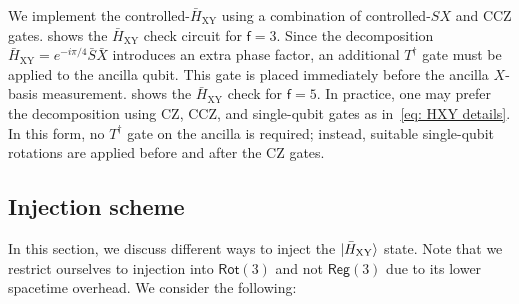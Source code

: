 \documentclass[%
    aps, 
    physrev,
    reprint,
]{revtex4-2}
\newcommand{\fd}[1]{\mathsf{f}=#1}
\newcommand{\rot}[1]{\mathsf{Rot}(#1)}
\newcommand{\reg}[1]{\mathsf{Reg}(#1)}
\newcommand{\XY}{_\mathrm{XY}}
\newcommand{\dg}{^\dagger}
\begin{document}
We implement the controlled-$\bar{H}\XY$ using a combination of controlled-$SX$ and CCZ gates.
 shows the $\bar H\XY$ check circuit for $\fd3$.
Since the decomposition $\bar H\XY = e^{-i\pi/4} \bar S \bar X$ introduces an extra phase factor, an additional $T\dg$ gate must be applied to the ancilla qubit. 
This gate is placed immediately before the ancilla $X$-basis measurement.
 shows the $\bar H\XY$ check for $\mathsf f=5$.
In practice, one may prefer the decomposition using CZ, CCZ, and single-qubit gates as in~\cref{eq: HXY details}. 
In this form, no $T\dg$ gate on the ancilla is required; instead, suitable single-qubit rotations are applied before and after the CZ gates.

\subsection{Injection scheme}\label{app:injection}


In this section, we discuss different ways to inject the $\ket{\bar{H}\XY}$ state.
Note that we restrict ourselves to injection into $\rot3$ and not $\reg3$ due to its lower spacetime overhead. 
We consider the following:
\end{document}
